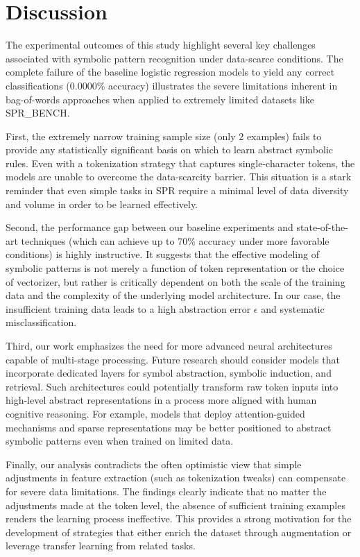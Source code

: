 \documentclass{article}
\begin{document}
\section{Discussion}
The experimental outcomes of this study highlight several key challenges associated with symbolic pattern recognition under data-scarce conditions. The complete failure of the baseline logistic regression models to yield any correct classifications (0.0000\% accuracy) illustrates the severe limitations inherent in bag-of-words approaches when applied to extremely limited datasets like SPR\_BENCH.

First, the extremely narrow training sample size (only 2 examples) fails to provide any statistically significant basis on which to learn abstract symbolic rules. Even with a tokenization strategy that captures single-character tokens, the models are unable to overcome the data-scarcity barrier. This situation is a stark reminder that even simple tasks in SPR require a minimal level of data diversity and volume in order to be learned effectively.

Second, the performance gap between our baseline experiments and state-of-the-art techniques (which can achieve up to 70\% accuracy under more favorable conditions) is highly instructive. It suggests that the effective modeling of symbolic patterns is not merely a function of token representation or the choice of vectorizer, but rather is critically dependent on both the scale of the training data and the complexity of the underlying model architecture. In our case, the insufficient training data leads to a high abstraction error \(\epsilon\) and systematic misclassification.

Third, our work emphasizes the need for more advanced neural architectures capable of multi-stage processing. Future research should consider models that incorporate dedicated layers for symbol abstraction, symbolic induction, and retrieval. Such architectures could potentially transform raw token inputs into high-level abstract representations in a process more aligned with human cognitive reasoning. For example, models that deploy attention-guided mechanisms and sparse representations may be better positioned to abstract symbolic patterns even when trained on limited data.

Finally, our analysis contradicts the often optimistic view that simple adjustments in feature extraction (such as tokenization tweaks) can compensate for severe data limitations. The findings clearly indicate that no matter the adjustments made at the token level, the absence of sufficient training examples renders the learning process ineffective. This provides a strong motivation for the development of strategies that either enrich the dataset through augmentation or leverage transfer learning from related tasks.
\end{document}
